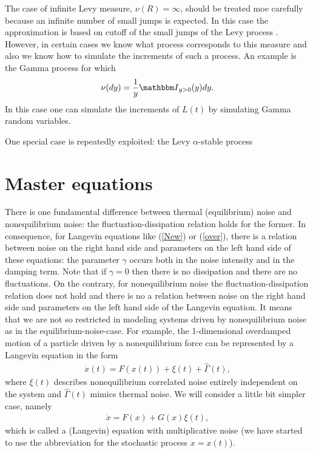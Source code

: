 \documentclass[authoryear,draft,1p,times]{elsarticle}
\newcommand{\be}{\begin{equation}}
\newcommand{\ee}{\end{equation}}
\renewcommand{\=}{\stackrel{\mathrm{d}}{=}}
\begin{document}
The case of infinite  Levy measure,  $\nu(R) = \infty$, should be treated moe carefully because  an infinite number of small jumps is expected.    In this case the   approximation is  based on  cutoff of the small jumps of the Levy process \cite{rubenthaler}.  However, in certain cases we know what process corresponds to this measure and also we know how to simulate the increments of such a process. An example is the Gamma process for which 
%
\be
\nu(dy) =\frac{1}{y}  {\mathbbm I}_{y>0}(y) dy.  
\ee
%
In this case one can simulate the increments of $L(t)$ by simulating Gamma random variables. 
 
 One special case is repeatedly exploited:   the Levy  $\alpha$-stable process 

                          


\section{Master equations}

There is one fundamental difference between thermal (equilibrium)   
noise and  nonequilibrium noise: the fluctuation-dissipation relation 
holds for the former. In consequence, for Langevin equations like 
(\ref{New}) or (\ref{over}), there is a  relation between noise 
on the right hand side and parameters on the left hand side of 
these equations:  the parameter $\gamma$ occurs both in the 
noise intensity and in the damping term. Note that if $\gamma =0$ 
then there is no dissipation and there are no fluctuations. 
On the contrary, for nonequilibrium noise  the fluctuation-dissipation 
relation  does not hold and there is no a  relation between noise 
on the right hand side and parameters on the left hand side of 
the Langevin equation. 
It means that we are not so  restricted in modeling 
systems driven by nonequilibrium noise as in the equilibrium-noise-case.  
For example, the 1-dimensional overdamped motion of  a particle 
driven by a nonequilibrium force can be represented by a Langevin equation 
in the form 
%
\begin{eqnarray}
\label{over2}
 \dot x(t)= F(x(t)) + \xi(t) + \hat\Gamma(t),
\end{eqnarray}
% 
where $\xi(t)$ describes nonequilibrium correlated noise entirely independent 
on the system and $\hat\Gamma(t)$ mimics thermal noise. 
   We will consider 
a little bit simpler case, namely  \cite{moss,jung}
%
\begin{eqnarray}
\label{multi}
 \dot x= F(x) + G(x) \xi(t), 
\end{eqnarray}
% 
which is called a (Langevin)  equation with multiplicative noise 
(we have started to use the abbreviation for the stochastic process $x=x(t)$).
\end{document}
